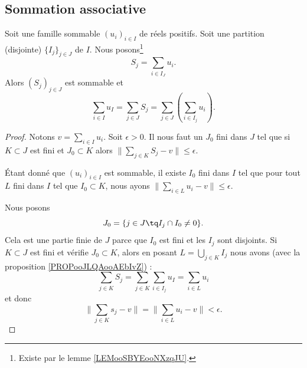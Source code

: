 \subsection{Sommation associative}

\begin{proposition}	\label{PROPooHGXZooXHIHeh}
	Soit une famille sommable \( (u_i)_{i\in I}\) de réels positifs. Soit une partition (disjointe) \(  \{ I_j \}_{j\in J}  \) de \( I\). Nous posons\footnote{Existe par le lemme \ref{LEMooSBYEooNXzqJU}.}
	\begin{equation}
		S_j=\sum_{i\in I_J}u_i.
	\end{equation}
	Alors \( (S_j)_{j\in J}\) est sommable et
	\begin{equation}
		\sum_{i\in I}u_I=\sum_{j\in J}S_j=\sum_{j\in J}\left( \sum_{i\in I_j}u_i \right).
	\end{equation}
\end{proposition}

\begin{proof}
	Notons \( v=\sum_{i\in I}u_i\). Soit \( \epsilon>0\). Il nous faut un \( J_0\) fini dans \( J\) tel que si \( K\subset J\) est fini et \( J_0\subset K\) alors \( \| \sum_{j\in K}S_j-v \|\leq \epsilon\).

	Étant donné que \( (u_i)_{i\in I}\) est sommable, il existe \( I_0\) fini dans \( I\) tel que pour tout \( L\) fini dans \( I\) tel que \( I_0\subset K\), nous ayons \( \| \sum_{i\in L}u_i-v \|\leq \epsilon\).

	Nous posons
	\begin{equation}
		J_0=\{ j\in J\tq I_{j}\cap I_0\neq 0 \}.
	\end{equation}
	Cela est une partie finie de \( J\) parce que \( I_0\) est fini et les \( I_j\) sont disjoints. Si \( K\subset J\) est fini et vérifie \( J_0\subset K\), alors en posant \( L=\bigcup_{j\in K}I_j\) nous avons (avec la proposition \ref{PROPooJLQAooAEbIvZ}) :
	\begin{equation}
		\sum_{j\in K}S_j  =\sum_{j\in K}\sum_{i\in I_j}u_I  =\sum_{i\in L}u_i
	\end{equation}
	et donc
	\begin{equation}
		\| \sum_{j\in K}s_j-v \| = 	 	\| \sum_{i\in L}u_i-v \|<\epsilon.
	\end{equation}
\end{proof}

